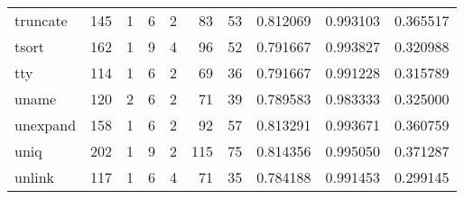\begin{longtable}{lrrrrrrrrr}
truncate  &                    145 &                                  1 &                                 6 &                                2 &                                83 &                              53 &                                0.812069 &                               0.993103 &                             0.365517 \\
tsort     &                    162 &                                  1 &                                 9 &                                4 &                                96 &                              52 &                                0.791667 &                               0.993827 &                             0.320988 \\
tty       &                    114 &                                  1 &                                 6 &                                2 &                                69 &                              36 &                                0.791667 &                               0.991228 &                             0.315789 \\
uname     &                    120 &                                  2 &                                 6 &                                2 &                                71 &                              39 &                                0.789583 &                               0.983333 &                             0.325000 \\
unexpand  &                    158 &                                  1 &                                 6 &                                2 &                                92 &                              57 &                                0.813291 &                               0.993671 &                             0.360759 \\
uniq      &                    202 &                                  1 &                                 9 &                                2 &                               115 &                              75 &                                0.814356 &                               0.995050 &                             0.371287 \\
unlink    &                    117 &                                  1 &                                 6 &                                4 &                                71 &                              35 &                                0.784188 &                               0.991453 &                             0.299145 \\

\end{longtable}
